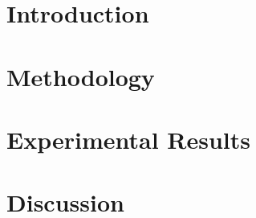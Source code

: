\minitoc


\section{Introduction}
\label{sec:bug-hunter:intro}


\section{Methodology}
\label{sec:bug-hunter:methodology}


\section{Experimental Results}
\label{sec:bug-hunter:results}


\section{Discussion}
\label{sec:bug-hunter:discussion}


% 